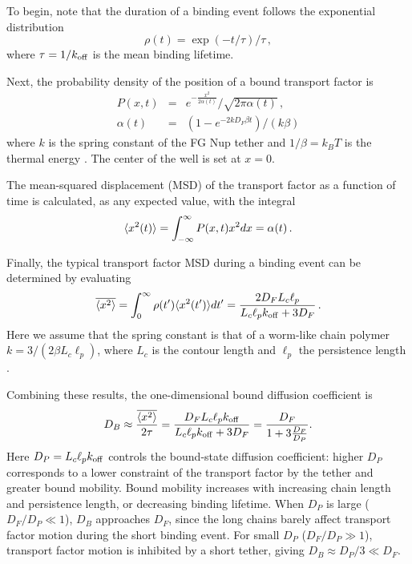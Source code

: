 To begin, note that the duration of a binding event follows the exponential distribution 
\begin{equation}
\rho (t) = \exp(-t/\tau)/\tau\,,
\end{equation}
where $\tau = 1/k_{\rm off}$ is the mean binding lifetime.

Next, the probability density of the position of a bound transport factor is 
\begin{eqnarray}
P(x,t) &=& e^{-\frac{x^2}{2 \alpha(t)}}/\sqrt{2\pi \alpha(t)}\,,\\
\alpha(t) &=& (1-e^{-2kD_F\beta t})/(k\beta)
\end{eqnarray}
 where $k$ is the spring constant of the FG Nup tether and $1/\beta = k_BT$ is the thermal energy \cite{doi88}.  The center of the well is set at $x=0$.

The mean-squared displacement (MSD) of the transport factor as a function of time is calculated, as any expected value, with the integral
\begin{equation}
\langle x^2(t) \rangle = \int_{-\infty}^{\infty} P(x,t) x^2 dx = \alpha(t)\,.
\end{equation}

Finally, the typical transport factor MSD during a binding event can be determined by evaluating
\begin{equation}\label{eq:sho}
  \overline{\langle x^2 \rangle} = \int_0^{\infty} \rho(t') \langle x^2(t') \rangle dt' = \frac{2D_F L_c
    \ell_p}{L_c \ell_p k_{\rm off}+ 3D_F}\,. 
\end{equation} %
Here we assume that the spring constant is that of a worm-like chain polymer $k = 3/(2\beta L_c \ell_p)$, where $L_c$ is the contour length and $\ell_p$ the persistence length \cite{howard01}.

Combining these results, the one-dimensional bound diffusion coefficient is
\begin{equation}\label{eq:dbound}
  D_B \approx \frac{\overline{\langle x^2 \rangle}}{2\tau} = \frac{D_F L_c \ell_p
    k_{\mathrm{off}}}{L_c \ell_p k_{\mathrm{off}} + 3D_F} =
  \frac{D_F}{1+3\frac{D_F}{D_{P}}}.  
\end{equation}
Here $D_P = L_c \ell_p k_{\mathrm{off}}$ controls the bound-state diffusion coefficient: higher $D_P$ corresponds to a lower constraint of the transport factor by the tether and greater bound mobility. Bound mobility increases with increasing chain length and persistence length, or decreasing binding lifetime. When $D_P$ is large ($D_F/D_P\ll1$), $D_B$ approaches $D_F$, since the long chains barely affect transport factor motion during the short binding event. For small $D_P$ ($D_F/D_P\gg1$), transport factor motion is inhibited by a short tether, giving $D_B\approx D_P/3\ll D_F$.  


